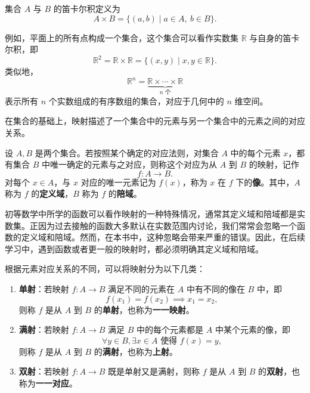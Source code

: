 \begin{definition}[笛卡尔积]
    \label{def_cartesian_product}
    集合 \(A\) 与 \(B\) 的笛卡尔积定义为
    \[
        A\times B=\{(a,b)\mid a\in A,\ b\in B\}.
    \]
\end{definition}

例如，平面上的所有点构成一个集合，这个集合可以看作实数集 \(\mathbb{R}\) 与自身的笛卡尔积，即
\[
    \mathbb{R}^2=\mathbb{R}\times\mathbb{R}
    =\{(x,y)\mid x,y\in\mathbb{R}\}.
\]
类似地，
\[
    \mathbb{R}^n
    =\underbrace{\mathbb{R}\times\cdots\times\mathbb{R}}_{n\text{ 个}}
\]
表示所有 \(n\) 个实数组成的有序数组的集合，对应于几何中的 \(n\) 维空间。


在集合的基础上，映射描述了一个集合中的元素与另一个集合中的元素之间的对应关系。
\begin{definition}[映射]
    \label{def_map}
    设 \(A,B\) 是两个集合。若按照某个确定的对应法则，对集合 \(A\) 中的每个元素 \(x\)，都有集合 \(B\) 中唯一确定的元素与之对应，则称这个对应为从 \(A\) 到 \(B\) 的映射，记作
    \[
        f:A\rightarrow B.
    \]
    对每个 \(x\in A\)，与 \(x\) 对应的唯一元素记为 \(f(x)\)，称为 \(x\) 在 \(f\) 下的\textbf{像}。其中，\(A\) 称为 \(f\) 的\textbf{定义域}，\(B\) 称为 \(f\) 的\textbf{陪域}。
\end{definition}

初等数学中所学的函数可以看作映射的一种特殊情况，通常其定义域和陪域都是实数集。正因为过去接触的函数大多默认在实数范围内讨论，我们常常会忽略一个函数的定义域和陪域。然而，在本书中，这种忽略会带来严重的错误。因此，在后续学习中，遇到函数或者更一般的映射时，都必须明确其定义域和陪域。

根据元素对应关系的不同，可以将映射分为以下几类：
\begin{enumerate}
    \item \textbf{单射}：若映射 \(f:A\rightarrow B\) 满足不同的元素在 \(A\) 中有不同的像在 \(B\) 中，即
          \[
              f(x_1)=f(x_2)\implies x_1=x_2,
          \]
          则称 \(f\) 是从 \(A\) 到 \(B\) 的\textbf{单射}，也称为\textbf{一一映射}。
    \item \textbf{满射}：若映射 \(f:A\rightarrow B\) 满足 \(B\) 中的每个元素都是 \(A\) 中某个元素的像，即
          \[
              \forall y\in B,\exists x\in A\text{ 使得 }f(x)=y,
          \]
          则称 \(f\) 是从 \(A\) 到 \(B\) 的\textbf{满射}，也称为\textbf{上射}。
    \item \textbf{双射}：若映射 \(f:A\rightarrow B\) 既是单射又是满射，则称 \(f\) 是从 \(A\) 到 \(B\) 的\textbf{双射}，也称为\textbf{一一对应}。
\end{enumerate}


